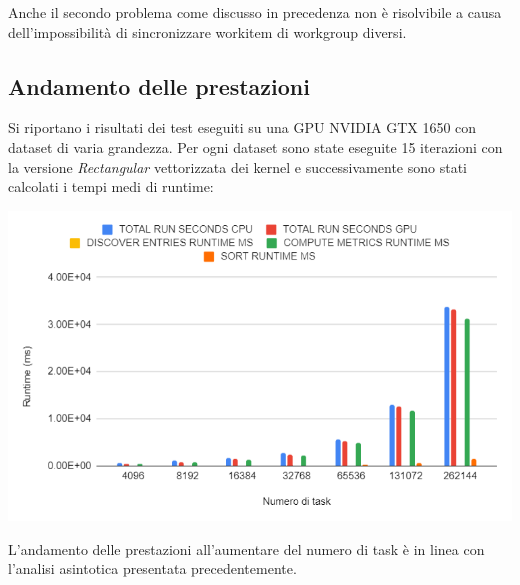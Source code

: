 \documentclass[../relazione.tex]{subfiles}
\begin{document}
Anche il secondo problema come discusso in precedenza non è risolvibile a causa dell'impossibilità di sincronizzare workitem di workgroup diversi.

\subsection{Andamento delle prestazioni}
Si riportano i risultati dei test eseguiti su una GPU NVIDIA GTX 1650 con dataset di varia grandezza. Per ogni dataset sono state eseguite 15 iterazioni con la versione \textit{Rectangular} vettorizzata dei kernel e successivamente sono stati calcolati i tempi medi di runtime:

\begin{center}
\includegraphics[scale=0.8]{images/andamento_prestazioni.png}
\end{center}

L'andamento delle prestazioni all'aumentare del numero di task è in linea con l'analisi asintotica presentata precedentemente. 
\end{document}
